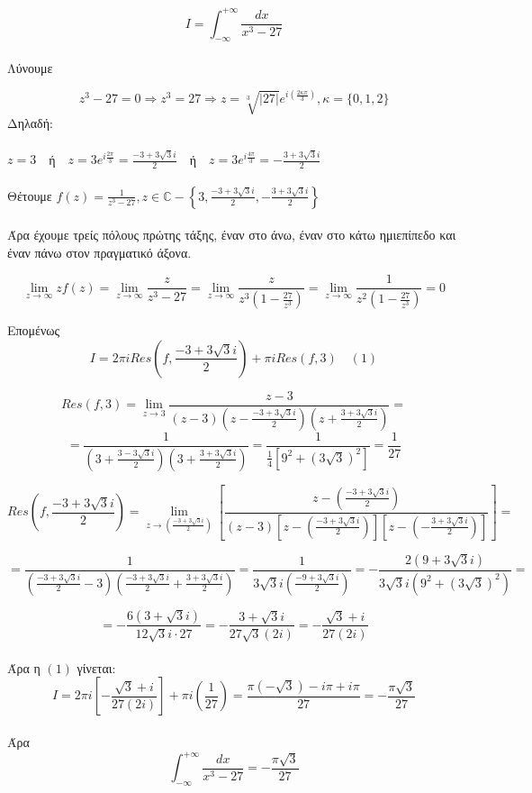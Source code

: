 \documentclass[12pt]{article}
\begin{document}
$$I= \int_{-\infty}^{+\infty} \frac{dx}{x^3-27}$$
\\ Λύνουμε

$$ z^3-27=0 \Rightarrow z^3=27 \Rightarrow
z=\sqrt[3]{|27|}e^{i \left(\frac{ 2\kappa \pi}{3} \right) } , \kappa=\{0,1,2\} $$
Δηλαδή:
\\ \\
$ z=3  \quad $ή$ \quad z=3e^{i\frac{2\pi}{3}}=\frac{-3+3\sqrt{3}i}{2}  \quad $ή$ \quad z=3e^{i\frac{4\pi}{3}}=-\frac{3+3\sqrt{3}i}{2}   $
\\
\\
Θέτουμε $ f(z)=\frac{1}{z^3-27},z\in\mathbb{C}-\left\{3, \frac{-3+3\sqrt{3}i}{2}  ,-\frac{3+3\sqrt{3}i}{2} \right\} $
\\ \\
Άρα έχουμε τρείς πόλους πρώτης τάξης, έναν στο άνω, έναν στο κάτω ημιεπίπεδο και έναν πάνω στον πραγματικό άξονα.

$$ \lim_{z \to \infty } zf(z)=\lim_{z \to \infty } \frac{z}{z^3-27}=
\lim_{z \to \infty } \frac{z}{z^3\left(1-\frac{27}{z^3}\right)}=
\lim_{z \to \infty } \frac{1}{z^2\left(1-\frac{27}{z^3}\right)} =0$$

Επομένως $$ Ι= 2 \pi i Res\left(f,\frac{-3+3\sqrt{3}i}{2} \right)+ \pi i Res(f,3)\quad (1) $$

$$  Res(f,3)=\lim_{z\to 3}\frac{z-3}{(z-3)\left(z-\frac{-3+3\sqrt{3}i}{2} \right)\left(z+\frac{3+3\sqrt{3}i}{2} \right)}=$$
$$= \frac{1}{\left(3+\frac{3-3\sqrt{3}i}{2} \right)\left(3+\frac{3+3\sqrt{3}i}{2} \right)}= \frac{1}{ \frac{1}{4} \left[ 9  ^2 + \left( 3\sqrt{3}\right) ^2 \right]}=\frac{1}{27}$$

$$ Res\left(f,\frac{-3+3\sqrt{3}i}{2}\right)=\lim_{z\to \left(\frac{-3+3\sqrt{3}i}{2}\right)} \left[ \frac{z-\left(\frac{-3+3\sqrt{3}i}{2}\right)}{(z-3)\left[z-\left(\frac{-3+3\sqrt{3}i}{2} \right) \right]\left[z-\left( -\frac{3+3\sqrt{3}i}{2} \right)\right]} \right]=  $$

$$=\frac{1}{ \left( \frac{-3+3\sqrt{3}i}{2} -3 \right) \left( \frac{-3+3\sqrt{3}i}{2}+ \frac{3+3\sqrt{3}i}{2} \right) }= \frac{1}{3\sqrt{3}i\left( \frac{-9+3\sqrt{3}i}{2} \right)} = -\frac{2\left(9+3\sqrt{3}i\right)}{3\sqrt{3}i\left(9^2+(3\sqrt{3})^2\right)}= $$

$$ = -\frac{6\left(3+\sqrt{3}i\right)}{12\sqrt{3}i \cdot27} = -\frac{3+\sqrt{3}i}{27\sqrt{3}(2i)}=-\frac{\sqrt{3}+i}{27(2i)}  $$
\\
Άρα η $(1)$ γίνεται:
\\
$$ Ι=2\pi i \left[ -\frac{\sqrt{3}+i}{27(2i)} \right] + \pi i \left( \frac{1}{27} \right) =
\frac{\pi (-\sqrt{3})-i\pi+i\pi}{27} = -\frac{\pi \sqrt{3}}{27}$$
\\
Άρα $$ \int_{-\infty}^{+\infty} \frac{dx}{x^3-27}= -\frac{\pi \sqrt{3}}{27} $$
\newpage
\end{document}
